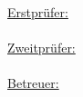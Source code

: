 \begin{titlepage}
   \vfill
   \raggedright
   \small 
   \centering
	\vfill	
	\uline{Erstprüfer:}\vspace{0.25\baselineskip}\\
	\prueferA\vspace{0.5\baselineskip}\\
	\uline{Zweitprüfer:}\vspace{0.25\baselineskip}\\
	\prueferB\vspace{2\baselineskip}\\
	\uline{Betreuer:}\vspace{0.25\baselineskip}\\
	\betreuer\vspace{0.25\baselineskip}\\
	\betreuerU\\
	

\end{titlepage}
